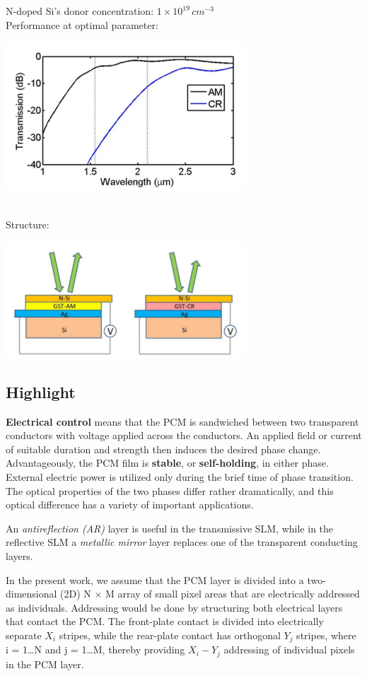\documentclass[]{article}
\begin{document}
N-doped Si's donor concentration: \(1 \times 10^{19} \,cm^{-3}\)\\
Performance at optimal parameter:\\
\centerline{\includegraphics[width = 9cm]{image/002_03.png}}\\
\newpage
Structure:\\
\centerline{\includegraphics[width = 9cm]{image/002_04.png}}

\subsection{Highlight}\label{highlight}

\textbf{Electrical control} means that the PCM is sandwiched between two
transparent conductors with voltage applied across the conductors. An
applied field or current of suitable duration and strength then induces
the desired phase change. Advantageously, the PCM film is
\textbf{stable}, or \textbf{self-holding}, in either phase. External
electric power is utilized only during the brief time of phase
transition. The optical properties of the two phases differ rather
dramatically, and this optical difference has a variety of important
applications.

An \emph{antireflection (AR)} layer is useful in the transmissive SLM,
while in the reflective SLM a \emph{metallic mirror} layer replaces one
of the transparent conducting layers.

In the present work, we assume that the PCM layer is divided into a
two-dimensional (2D) N × M array of small pixel areas that are
electrically addressed as individuals. Addressing would be done by
structuring both electrical layers that contact the PCM. The front-plate
contact is divided into electrically separate \(X_i\) stripes, while the
rear-plate contact has orthogonal \(Y_j\) stripes, where i = 1\ldots{}N
and j = 1\ldots{}M, thereby providing \(X_i - Y_j\) addressing of
individual pixels in the PCM layer.
\end{document}

